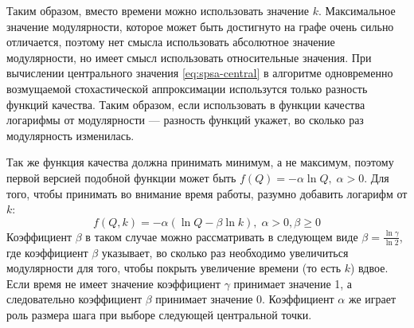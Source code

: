 Таким образом, вместо времени можно использовать значение $k$. Максимальное значение модулярности, которое может быть достигнуто на графе очень сильно отличается, поэтому нет смысла использовать абсолютное значение модулярности, но имеет смысл использовать относительные значения. При вычислении центрального значения \eqref{eq:spsa-central} в алгоритме одновременно возмущаемой стохастической аппроксимации использутся только разность функций качества. Таким образом, если использовать в функции качества логарифмы от модулярности --- разность функций укажет, во сколько раз модулярность изменилась.

Так же функция качества должна принимать минимум, а не максимум, поэтому первой версией подобной функции может быть $f(Q) = -\alpha \ln Q,\;\alpha > 0$. Для того, чтобы принимать во внимание время работы, разумно добавить логарифм от $k$: 
\begin{equation} \label{eq:arg-f}
f(Q, k) = -\alpha (\ln Q - \beta \ln k),\;\alpha > 0, \beta \ge 0
\end{equation}
Коэффициент $\beta$ в таком случае можно рассматривать в следующем виде $\beta = \frac{\ln \gamma}{\ln 2}$, где коэффициент $\beta$ указывает, во сколько раз необходимо увеличиться модулярности для того, чтобы покрыть увеличение времени (то есть $k$) вдвое. Если время не имеет значение коэффициент $\gamma$ принимает значение 1, а следовательно коэффициент $\beta$ принимает значение 0. Коэффициент $\alpha$ же играет роль размера шага при выборе следующей центральной точки.

